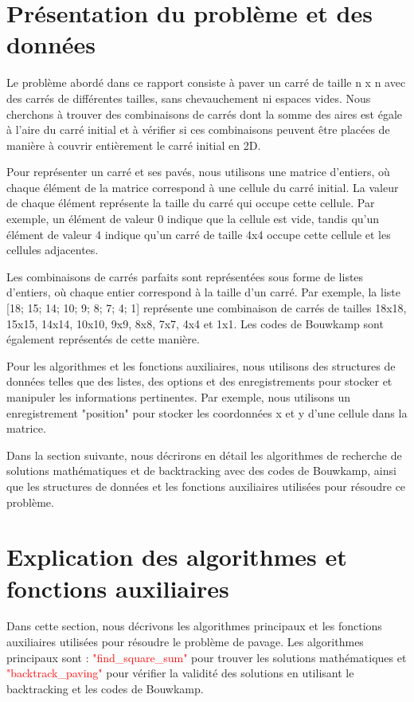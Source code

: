 \documentclass{article}
\begin{document}
\section{Présentation du problème et des données}

Le problème abordé dans ce rapport consiste à paver un carré de taille n x n avec des carrés de différentes tailles, sans chevauchement ni espaces vides. Nous cherchons à trouver des combinaisons de carrés dont la somme des aires est égale à l'aire du carré initial et à vérifier si ces combinaisons peuvent être placées de manière à couvrir entièrement le carré initial en 2D.

Pour représenter un carré et ses pavés, nous utilisons une matrice d'entiers, où chaque élément de la matrice correspond à une cellule du carré initial. La valeur de chaque élément représente la taille du carré qui occupe cette cellule. Par exemple, un élément de valeur 0 indique que la cellule est vide, tandis qu'un élément de valeur 4 indique qu'un carré de taille 4x4 occupe cette cellule et les cellules adjacentes.

Les combinaisons de carrés parfaits sont représentées sous forme de listes d'entiers, où chaque entier correspond à la taille d'un carré. Par exemple, la liste [18; 15; 14; 10; 9; 8; 7; 4; 1] représente une combinaison de carrés de tailles 18x18, 15x15, 14x14, 10x10, 9x9, 8x8, 7x7, 4x4 et 1x1. Les codes de Bouwkamp sont également représentés de cette manière.

Pour les algorithmes et les fonctions auxiliaires, nous utilisons des structures de données telles que des listes, des options et des enregistrements pour stocker et manipuler les informations pertinentes. Par exemple, nous utilisons un enregistrement "position" pour stocker les coordonnées x et y d'une cellule dans la matrice.

Dans la section suivante, nous décrirons en détail les algorithmes de recherche de solutions mathématiques et de backtracking avec des codes de Bouwkamp, ainsi que les structures de données et les fonctions auxiliaires utilisées pour résoudre ce problème.

\section{Explication des algorithmes et fonctions auxiliaires}

Dans cette section, nous décrivons les algorithmes principaux et les fonctions auxiliaires utilisées pour résoudre le problème de pavage. Les algorithmes principaux sont : \textcolor{red}{"find\_square\_sum"} pour trouver les solutions mathématiques et \textcolor{red}{"backtrack\_paving"} pour vérifier la validité des solutions en utilisant le backtracking et les codes de Bouwkamp.
\end{document}
